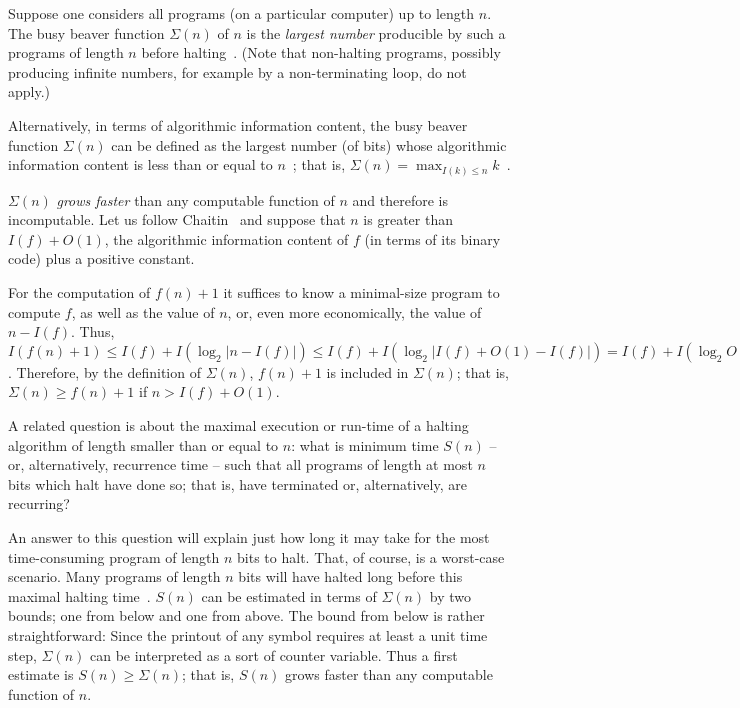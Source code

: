 Suppose one considers all  programs (on a particular computer)
up to length  $n$.
The busy beaver function  $\Sigma (n)$  of $n$
is the {\em largest number} producible by such a programs of length $n$ before halting~\cite{rado,dewdney,brady}.
(Note that non-halting programs, possibly producing infinite numbers, for example by a non-terminating loop, do not apply.)

Alternatively,  in terms of algorithmic information content,
the busy beaver function $\Sigma (n)$
can be defined as the largest number (of bits) whose algorithmic information content is less than or equal to $n$~\cite{chaitin-ACM,chaitin-bb};
that is, $\Sigma (n) = \max_{I(k)\le n} k$~\cite[Definition~5.3, p.~414]{chaitin-ACM}.

$\Sigma (n)$ {\em grows faster} than any computable function of $n$ and therefore is incomputable.
Let us follow Chaitin~\cite{chaitin-bb}
and suppose that $n$ is greater than $I(f)+O(1)$, the algorithmic information content of $f$ (in terms of its binary code) plus a positive constant.

For the computation of $f(n)+1$ it suffices to know a minimal-size program to compute $f$, as well as the value of $n$,
or, even more economically, the value of $n - I(f)$.
Thus,
$
I(f(n)+1)
\le
I(f) +  I( \log_2 \vert n- I(f)\vert )
\le
I(f) +  I( \log_2 \vert I(f) + O(1)- I(f)\vert )
=
I(f) +  I( \log_2   O(1) )
<
I(f) +  I(  O(1) )
<
I(f) +   O(1)
< n
$.
Therefore, by the definition of  $\Sigma (n)$,  $f(n)+1$ is included  in $\Sigma (n)$; that is, $\Sigma (n) \ge f(n)+1$  if  $n > I(f)+O(1)$.


A related question is about the maximal execution or run-time of a halting algorithm of length smaller than or equal to $n$:
what is minimum time $S(n)$  --  or,
alternatively, recurrence time  --  such that all programs of length at most $n$ bits which halt
have done so; that is, have
terminated  or, alternatively, are recurring?

An answer to this question will explain just how long it may take for the most time-consuming program of length $n$ bits to
halt. That, of course, is a worst-case scenario. Many programs of
length $n$ bits will have halted long  before this maximal halting time~\cite{CALUDE2008295}.
$S(n)$ can be estimated in terms of $\Sigma (n)$
by two bounds; one from below and one from above.
The bound from below is rather straightforward:
Since the printout of any symbol requires at least a unit time step,
$\Sigma (n)$ can be interpreted as a sort of counter variable.
Thus a first estimate is $S(n )\ge \Sigma (n)$;
that is, $S(n)$ grows faster than any computable function of $n$.

